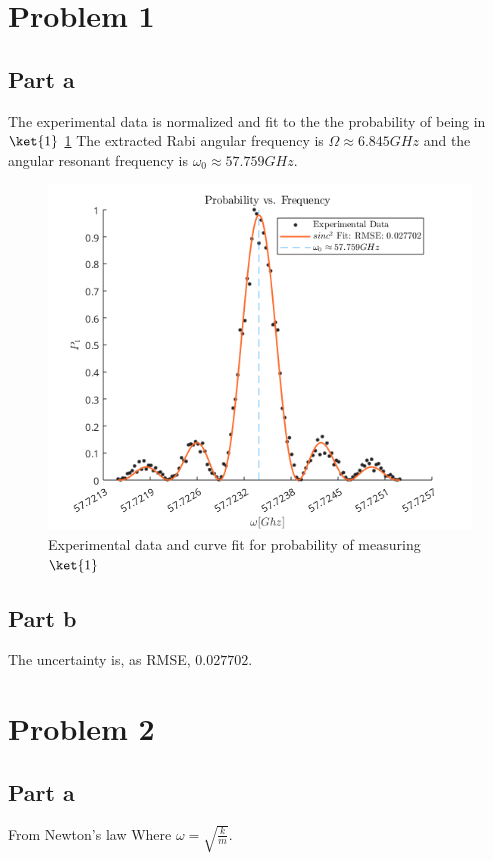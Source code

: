 \section*{Problem 1}
\subsection*{Part a}
The experimental data is normalized and fit to the the probability of being in $\ket{1}$ \ref{fig:rabi}
The extracted Rabi angular frequency is $\Omega \approx 6.845 GHz$ and the angular resonant frequency is $\omega_0 \approx 57.759 GHz$.
\begin{figure}[h]
    \centering
    \includegraphics[width=1\linewidth]{Resources//245//Homework 4/245 Homework 4 Problem 1.png}
    \caption{Experimental data and curve fit for probability of measuring $\ket{1}$}
    \label{fig:rabi}
\end{figure}

\subsection*{Part b}
The uncertainty is, as RMSE, $0.027702$.

\section*{Problem 2}
\subsection*{Part a}
From Newton's law
Where $\omega = \sqrt{\frac{k}{m}}$.

